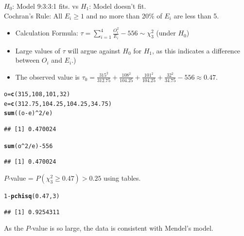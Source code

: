 \documentclass[t,xcolor=pdftex,dvipsnames,table]{beamer}
\makeatletter
\newcommand{\hlnum}[1]{\textcolor[rgb]{0.686,0.059,0.569}{#1}}%
\newcommand{\hlopt}[1]{\textcolor[rgb]{0,0,0}{#1}}%
\newcommand{\hlstd}[1]{\textcolor[rgb]{0.345,0.345,0.345}{#1}}%
\newcommand{\hlkwb}[1]{\textcolor[rgb]{0.69,0.353,0.396}{#1}}%
\newcommand{\hlkwd}[1]{\textcolor[rgb]{0.737,0.353,0.396}{\textbf{#1}}}%
\newenvironment{kframe}{%
 \def\at@end@of@kframe{}%
 \ifinner\ifhmode%
  \def\at@end@of@kframe{\end{minipage}}%
  \begin{minipage}{\columnwidth}%
 \fi\fi%
 \def\FrameCommand##1{\hskip\@totalleftmargin \hskip-\fboxsep
 \colorbox{shadecolor}{##1}\hskip-\fboxsep
     \hskip-\linewidth \hskip-\@totalleftmargin \hskip\columnwidth}%
 \MakeFramed {\advance\hsize-\width
   \@totalleftmargin\z@ \linewidth\hsize
   \@setminipage}}%
 {\par\unskip\endMakeFramed%
 \at@end@of@kframe}
\newenvironment{knitrout}{}{} %
\makeatother
\begin{document}
\begin{frame}[fragile]{}

 $H_{0}$: Model 9:3:3:1 fits. vs $H_{1}$: Model doesn't fit. \\

 Cochran's Rule: All $E_{i} \geq 1$ and no more than 20\% of $E_{i}$ are less than 5. 

\begin{itemize}
\item Calculation Formula: $\tau = \sum_{i=1}^{4} \frac{O_{i}^2}{E_{i}} - 556 \sim \chi^2_{3}$ (under $H_{0}$)
\item Large values of $\tau$ will argue against $H_{0}$ for $H_{1}$, as this indicates a difference between $O_{i}$ and $E_{i}$.)
\item The observed value is $\tau_{0} = \frac{315^2}{312.75} + \frac{108^2}{104.25} + \frac{101^2}{104.25} + \frac{32^2}{34.75} - 556 \approx 0.47$. 
\end{itemize}

\begin{knitrout}
\color{fgcolor}\begin{kframe}
\begin{alltt}
\hlstd{o}\hlkwb{=}\hlkwd{c}\hlstd{(}\hlnum{315}\hlstd{,}\hlnum{108}\hlstd{,}\hlnum{101}\hlstd{,}\hlnum{32}\hlstd{)}
\hlstd{e}\hlkwb{=}\hlkwd{c}\hlstd{(}\hlnum{312.75}\hlstd{,}\hlnum{104.25}\hlstd{,}\hlnum{104.25}\hlstd{,}\hlnum{34.75}\hlstd{)}
\hlkwd{sum}\hlstd{((o}\hlopt{-}\hlstd{e)}\hlopt{^}\hlnum{2}\hlopt{/}\hlstd{e)}
\end{alltt}
\begin{verbatim}
## [1] 0.470024
\end{verbatim}
\begin{alltt}
\hlkwd{sum}\hlstd{(o}\hlopt{^}\hlnum{2}\hlopt{/}\hlstd{e)} \hlopt{-} \hlnum{556}
\end{alltt}
\begin{verbatim}
## [1] 0.470024
\end{verbatim}
\end{kframe}
\end{knitrout}
\end{frame}  


\begin{frame}[fragile]{}
 $P$-value = $P( \chi^2_{3} \geq 0.47) > 0.25 $ using tables.

\begin{knitrout}
\color{fgcolor}\begin{kframe}
\begin{alltt}
\hlnum{1}\hlopt{-}\hlkwd{pchisq}\hlstd{(}\hlnum{0.47}\hlstd{,}\hlnum{3}\hlstd{)}
\end{alltt}
\begin{verbatim}
## [1] 0.9254311
\end{verbatim}
\end{kframe}
\end{knitrout}


 As the $P$-value is so large, the data is consistent with Mendel's model.
\end{frame}  
\end{document}
